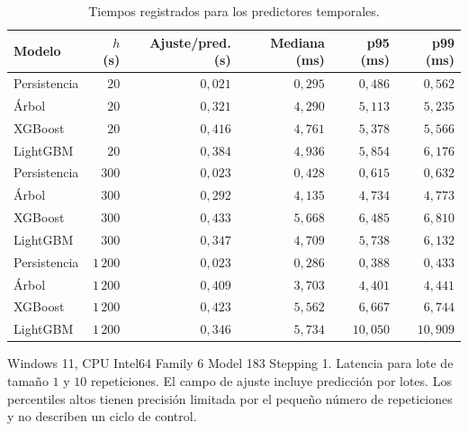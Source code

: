\begin{table}[htbp]
\centering
\caption{Tiempos registrados para los predictores temporales.}
\label{tab:res_costo_ml}
\small
\setlength{\tabcolsep}{5pt}
\begin{tabular}{lrrrrr}
\toprule
Modelo & $h$ (s) & Ajuste/pred. (s) & Mediana (ms) & p95 (ms) & p99 (ms) \\
\midrule
Persistencia & $20$ & $0{,}021$ & $0{,}295$ & $0{,}486$ & $0{,}562$ \\
Árbol & $20$ & $0{,}321$ & $4{,}290$ & $5{,}113$ & $5{,}235$ \\
XGBoost & $20$ & $0{,}416$ & $4{,}761$ & $5{,}378$ & $5{,}566$ \\
LightGBM & $20$ & $0{,}384$ & $4{,}936$ & $5{,}854$ & $6{,}176$ \\
Persistencia & $300$ & $0{,}023$ & $0{,}428$ & $0{,}615$ & $0{,}632$ \\
Árbol & $300$ & $0{,}292$ & $4{,}135$ & $4{,}734$ & $4{,}773$ \\
XGBoost & $300$ & $0{,}433$ & $5{,}668$ & $6{,}485$ & $6{,}810$ \\
LightGBM & $300$ & $0{,}347$ & $4{,}709$ & $5{,}738$ & $6{,}132$ \\
Persistencia & $1\,200$ & $0{,}023$ & $0{,}286$ & $0{,}388$ & $0{,}433$ \\
Árbol & $1\,200$ & $0{,}409$ & $3{,}703$ & $4{,}401$ & $4{,}441$ \\
XGBoost & $1\,200$ & $0{,}423$ & $5{,}562$ & $6{,}667$ & $6{,}744$ \\
LightGBM & $1\,200$ & $0{,}346$ & $5{,}734$ & $10{,}050$ & $10{,}909$ \\
\bottomrule
\end{tabular}
\par\vspace{3pt}
\begin{minipage}{0.98\textwidth}\footnotesize
Windows 11, CPU Intel64 Family 6 Model 183 Stepping 1. Latencia para lote de tamaño $1$ y $10$ repeticiones. El campo de ajuste incluye predicción por lotes. Los percentiles altos tienen precisión limitada por el pequeño número de repeticiones y no describen un ciclo de control.
\end{minipage}
\end{table}
